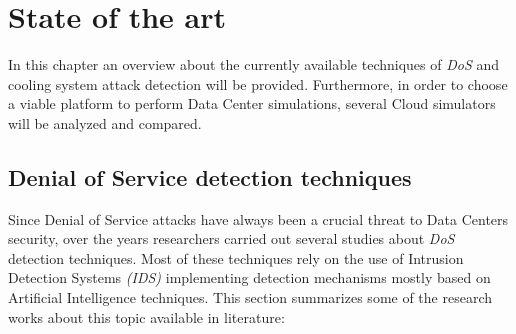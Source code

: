 
\chapter{State of the art}

\begin{citazione}
In this chapter an overview about the currently available techniques of \emph{DoS} and cooling system attack detection will be provided. Furthermore, in order to choose a viable platform to perform Data Center simulations, several Cloud simulators will be analyzed and compared.
\end{citazione}
\newpage

\section{Denial of Service detection techniques} \label{section:dos_detection}
Since Denial of Service attacks have always been a crucial threat to Data Centers security, over the years researchers carried out several studies about \emph{DoS} detection techniques. Most of these techniques rely on the use of Intrusion Detection Systems \emph{(IDS)} implementing detection mechanisms mostly based on Artificial Intelligence techniques. This section summarizes some of the research works about this topic available in literature:
